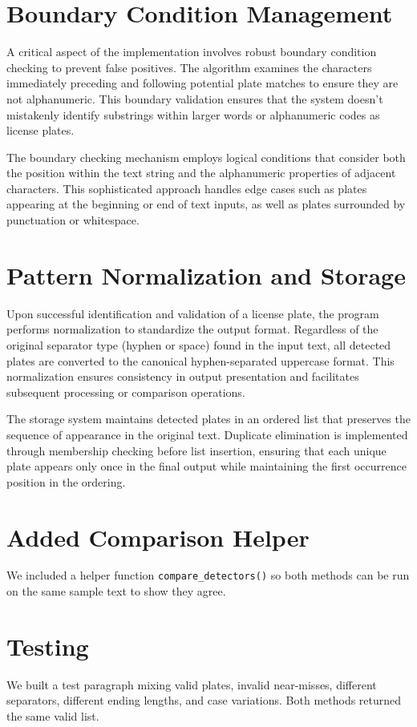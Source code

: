 \documentclass[12pt,a4paper]{article}
\begin{document}
\section{Boundary Condition Management}

A critical aspect of the implementation involves robust boundary condition checking to prevent false positives. The algorithm examines the characters immediately preceding and following potential plate matches to ensure they are not alphanumeric. This boundary validation ensures that the system doesn't mistakenly identify substrings within larger words or alphanumeric codes as license plates.

The boundary checking mechanism employs logical conditions that consider both the position within the text string and the alphanumeric properties of adjacent characters. This sophisticated approach handles edge cases such as plates appearing at the beginning or end of text inputs, as well as plates surrounded by punctuation or whitespace.

\section{Pattern Normalization and Storage}

Upon successful identification and validation of a license plate, the program performs normalization to standardize the output format. Regardless of the original separator type (hyphen or space) found in the input text, all detected plates are converted to the canonical hyphen-separated uppercase format. This normalization ensures consistency in output presentation and facilitates subsequent processing or comparison operations.

The storage system maintains detected plates in an ordered list that preserves the sequence of appearance in the original text. Duplicate elimination is implemented through membership checking before list insertion, ensuring that each unique plate appears only once in the final output while maintaining the first occurrence position in the ordering.

\section{Added Comparison Helper}
We included a helper function \texttt{compare\_detectors()} so both methods can be run on the same sample text to show they agree.

\section{Testing}
We built a test paragraph mixing valid plates, invalid near-misses, different separators, different ending lengths, and case variations. Both methods returned the same valid list.
\end{document}
